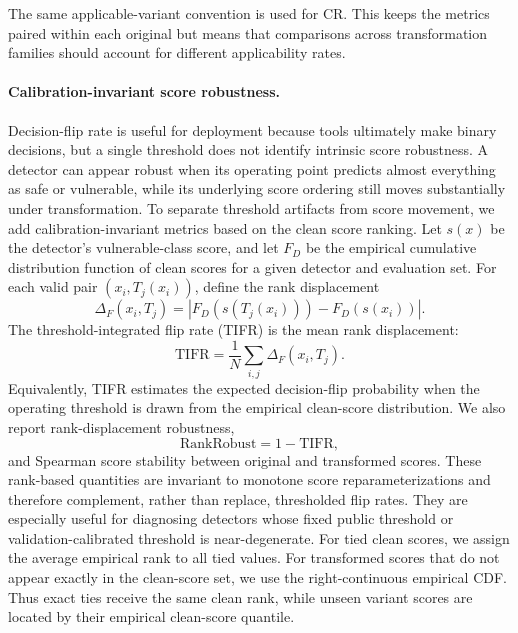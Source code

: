 \documentclass[a4paper,fleqn]{cas-dc}
\begin{document}
The same applicable-variant convention is used for CR. This keeps the metrics
paired within each original but means that comparisons across transformation
families should account for different applicability rates.

\paragraph{Calibration-invariant score robustness.}
Decision-flip rate is useful for deployment because tools ultimately make
binary decisions, but a single threshold does not identify intrinsic score
robustness. A detector can appear robust when its operating point predicts
almost everything as safe or vulnerable, while its underlying score ordering
still moves substantially under transformation. To separate threshold artifacts
from score movement, we add calibration-invariant metrics based on the clean
score ranking. Let $s(x)$ be the detector's vulnerable-class score, and let
$F_D$ be the empirical cumulative distribution function of clean scores for a
given detector and evaluation set. For each valid pair $(x_i,T_j(x_i))$, define
the rank displacement
\begin{equation}
\Delta_F(x_i,T_j)=\left|F_D(s(T_j(x_i)))-F_D(s(x_i))\right|.
\end{equation}
The threshold-integrated flip rate (TIFR) is the mean rank displacement:
\begin{equation}
\text{TIFR}=\frac{1}{N}\sum_{i,j}\Delta_F(x_i,T_j).
\end{equation}
Equivalently, TIFR estimates the expected decision-flip probability when the
operating threshold is drawn from the empirical clean-score distribution. We
also report rank-displacement robustness,
\begin{equation}
\text{RankRobust}=1-\text{TIFR},
\end{equation}
and Spearman score stability between original and transformed scores. These
rank-based quantities are invariant to monotone score reparameterizations and
therefore complement, rather than replace, thresholded flip rates. They are
especially useful for diagnosing detectors whose fixed public threshold or
validation-calibrated threshold is near-degenerate.
For tied clean scores, we assign the average empirical rank to all tied values.
For transformed scores that do not appear exactly in the clean-score set, we
use the right-continuous empirical CDF. Thus exact ties receive the same clean
rank, while unseen variant scores are located by their empirical clean-score
quantile.
\end{document}
